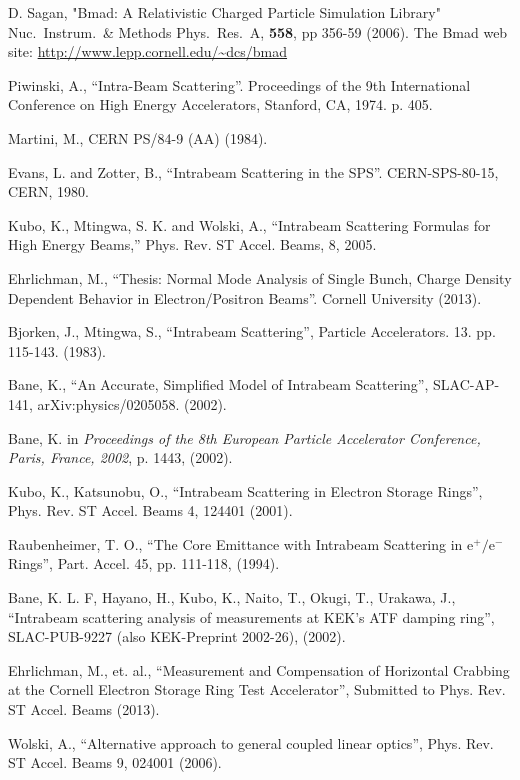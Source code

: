 \documentclass[11pt]{article}
\begin{document}
\begin{thebibliography}{9}

D. Sagan,
"Bmad: A Relativistic Charged Particle Simulation Library"
Nuc.\ Instrum.\ \& Methods Phys.\ Res.\ A, {\bf 558}, pp 356-59 (2006).
The Bmad web site:
\hfill\break
\hspace*{0.3in} \url{http://www.lepp.cornell.edu/~dcs/bmad}

Piwinski, A., ``Intra-Beam Scattering''.
Proceedings of the 9th International Conference on High Energy Accelerators,
Stanford, CA, 1974. p. 405.

Martini, M., CERN PS/84-9 (AA) (1984).

Evans, L. and Zotter, B., ``Intrabeam Scattering in the SPS''.
CERN-SPS-80-15, CERN, 1980.

Kubo, K., Mtingwa, S. K. and Wolski, A., ``Intrabeam Scattering Formulas for 
High Energy Beams,'' Phys. Rev. ST Accel. Beams, 8, 2005.

Ehrlichman, M., ``Thesis: Normal Mode Analysis of Single Bunch, Charge Density
Dependent Behavior in Electron/Positron Beams''.  Cornell University (2013).

Bjorken, J., Mtingwa, S., ``Intrabeam Scattering'', Particle Accelerators. 13. 
pp. 115-143. (1983).

Bane, K., ``An Accurate, Simplified Model of Intrabeam Scattering'', SLAC-AP-141,
arXiv:physics/0205058. (2002).

Bane, K. in {\it Proceedings of the 8th European Particle Accelerator Conference, Paris,
France, 2002}, p. 1443, (2002).

Kubo, K., Katsunobu, O., ``Intrabeam Scattering in Electron Storage Rings'',
Phys. Rev. ST Accel. Beams 4, 124401 (2001).

Raubenheimer, T. O., ``The Core Emittance with Intrabeam Scattering in e$^+/$e$^-$ Rings'',
Part. Accel. 45, pp. 111-118, (1994).

Bane, K. L. F, Hayano, H., Kubo, K., Naito, T., Okugi, T., Urakawa, J.,
``Intrabeam scattering analysis of measurements at KEK's ATF damping ring'',
SLAC-PUB-9227 (also KEK-Preprint 2002-26), (2002).

Ehrlichman, M., et. al., ``Measurement and Compensation of Horizontal Crabbing at the
Cornell Electron Storage Ring Test Accelerator'',
Submitted to Phys. Rev. ST Accel. Beams (2013).

Wolski, A., ``Alternative approach to general coupled linear optics'', 
Phys. Rev. ST Accel. Beams 9, 024001 (2006).



\end{thebibliography}
\end{document}
